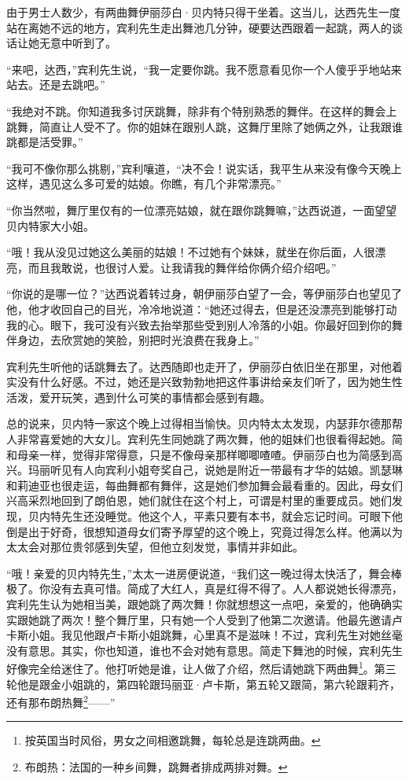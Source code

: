 \par 由于男士人数少，有两曲舞伊丽莎白·贝内特只得干坐着。这当儿，达西先生一度站在离她不远的地方，宾利先生走出舞池几分钟，硬要达西跟着一起跳，两人的谈话让她无意中听到了。
\par “来吧，达西，”宾利先生说，“我一定要你跳。我不愿意看见你一个人傻乎乎地站来站去。还是去跳吧。”
\par “我绝对不跳。你知道我多讨厌跳舞，除非有个特别熟悉的舞伴。在这样的舞会上跳舞，简直让人受不了。你的姐妹在跟别人跳，这舞厅里除了她俩之外，让我跟谁跳都是活受罪。”
\par “我可不像你那么挑剔，”宾利嚷道，“决不会！说实话，我平生从来没有像今天晚上这样，遇见这么多可爱的姑娘。你瞧，有几个非常漂亮。”
\par “你当然啦，舞厅里仅有的一位漂亮姑娘，就在跟你跳舞嘛，”达西说道，一面望望贝内特家大小姐。
\par “哦！我从没见过她这么美丽的姑娘！不过她有个妹妹，就坐在你后面，人很漂亮，而且我敢说，也很讨人爱。让我请我的舞伴给你俩介绍介绍吧。”
\par “你说的是哪一位？”达西说着转过身，朝伊丽莎白望了一会，等伊丽莎白也望见了他，他才收回自己的目光，冷冷地说道：“她还过得去，但是还没漂亮到能够打动我的心。眼下，我可没有兴致去抬举那些受到别人冷落的小姐。你最好回到你的舞伴身边，去欣赏她的笑脸，别把时光浪费在我身上。”
\par 宾利先生听他的话跳舞去了。达西随即也走开了，伊丽莎白依旧坐在那里，对他着实没有什么好感。不过，她还是兴致勃勃地把这件事讲给亲友们听了，因为她生性活泼，爱开玩笑，遇到什么可笑的事情都会感到有趣。
\par 总的说来，贝内特一家这个晚上过得相当愉快。贝内特太太发现，内瑟菲尔德那帮人非常喜爱她的大女儿。宾利先生同她跳了两次舞，他的姐妹们也很看得起她。简和母亲一样，觉得非常得意，只是不像母亲那样唧唧喳喳。伊丽莎白也为简感到高兴。玛丽听见有人向宾利小姐夸奖自己，说她是附近一带最有才华的姑娘。凯瑟琳和莉迪亚也很走运，每曲舞都有舞伴，这是她们参加舞会最看重的。因此，母女们兴高采烈地回到了朗伯恩，她们就住在这个村上，可谓是村里的重要成员。她们发现，贝内特先生还没睡觉。他这个人，平素只要有本书，就会忘记时间。可眼下他倒是出于好奇，很想知道母女们寄予厚望的这个晚上，究竟过得怎么样。他满以为太太会对那位贵邻感到失望，但他立刻发觉，事情并非如此。
\par “哦！亲爱的贝内特先生，”太太一进房便说道，“我们这一晚过得太快活了，舞会棒极了。你没有去真可惜。简成了大红人，真是红得不得了。人人都说她长得漂亮，宾利先生认为她相当美，跟她跳了两次舞！你就想想这一点吧，亲爱的，他确确实实跟她跳了两次！整个舞厅里，只有她一个人受到了他第二次邀请。他最先邀请卢卡斯小姐。我见他跟卢卡斯小姐跳舞，心里真不是滋味！不过，宾利先生对她丝毫没有意思。其实，你也知道，谁也不会对她有意思。简走下舞池的时候，宾利先生好像完全给迷住了。他打听她是谁，让人做了介绍，然后请她跳下两曲舞\footnote{按英国当时风俗，男女之间相邀跳舞，每轮总是连跳两曲。}。第三轮他是跟金小姐跳的，第四轮跟玛丽亚·卢卡斯，第五轮又跟简，第六轮跟莉齐，还有那布朗热舞\footnote{布朗热：法国的一种乡间舞，跳舞者排成两排对舞。}——”
